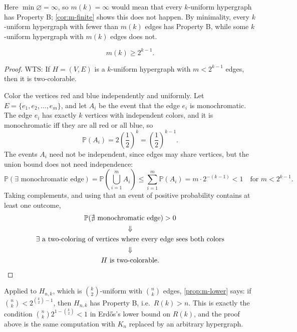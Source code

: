Here \(\min \varnothing = \infty\), so \(m(k) = \infty\) would mean that every \(k\)-uniform hypergraph has Property B; \autoref{cor:m-finite} shows this does not happen. By minimality, every \(k\)-uniform hypergraph with fewer than \(m(k)\) edges has Property B, while some \(k\)-uniform hypergraph with \(m(k)\) edges does not.

\begin{proposition}[Erd\H{o}s, 1963]\label{prop:m-lower}
    \[
        m(k) \ge 2^{k-1}.
    \]
\end{proposition}

\begin{proof}
    WTS: If \(H = (V, E)\) is a \(k\)-uniform hypergraph with \(m < 2^{k-1}\) edges, then it is two-colorable.

    Color the vertices red and blue independently and uniformly. Let \(E = \{e_1, e_2, \ldots, e_m\}\), and let \(A_i\) be the event that the edge \(e_i\) is monochromatic. The edge \(e_i\) has exactly \(k\) vertices with independent colors, and it is monochromatic iff they are all red or all blue, so
    \[
        \mathbb{P}(A_i) = 2 \left( \frac{1}{2} \right)^k = \left( \frac{1}{2} \right)^{k-1}.
    \]
    The events \(A_i\) need not be independent, since edges may share vertices, but the union bound does not need independence:
    \[
        \mathbb{P}(\exists \text{ monochromatic edge}) = \mathbb{P}\left( \bigcup_{i=1}^{m} A_i \right) \le \sum_{i=1}^{m} \mathbb{P}(A_i) = m \cdot 2^{-(k-1)} < 1 \quad \text{for } m < 2^{k-1}.
    \]
    Taking complements, and using that an event of positive probability contains at least one outcome,
    \begin{gather*}
        \mathbb{P}(\nexists \text{ monochromatic edge}) > 0 \\
        \Downarrow \\
        \exists \text{ a two-coloring of vertices where every edge sees both colors} \\
        \Downarrow \\
        H \text{ is two-colorable.} \qedhere
    \end{gather*}
\end{proof}

\begin{remark}
    Applied to \(H_{n,k}\), which is \(\binom{k}{2}\)-uniform with \(\binom{n}{k}\) edges, \autoref{prop:m-lower} says: if \(\binom{n}{k} < 2^{\binom{k}{2} - 1}\), then \(H_{n,k}\) has Property B, i.e.\ \(R(k) > n\). This is exactly the condition \(\binom{n}{k} 2^{1 - \binom{k}{2}} < 1\) in Erd\H{o}s's lower bound on \(R(k)\), and the proof above is the same computation with \(K_n\) replaced by an arbitrary hypergraph.
\end{remark}

